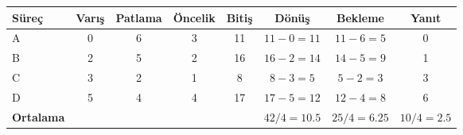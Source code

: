 \begin{tabular}{@{}lccccccc@{}}
\toprule
\textbf{Süreç} & \textbf{Varış} & \textbf{Patlama} & \textbf{Öncelik} & \textbf{Bitiş} & \textbf{Dönüş} & \textbf{Bekleme} & \textbf{Yanıt}\\
\midrule
A & 0 & 6 & 3 & 11 & $11-0=11$ & $11-6=5$ & 0\\
B & 2 & 5 & 2 & 16 & $16-2=14$ & $14-5=9$ & 1\\
C & 3 & 2 & 1 & 8 & $8-3=5$ & $5-2=3$ & 3\\
D & 5 & 4 & 4 & 17 & $17-5=12$ & $12-4=8$ & 6\\
\midrule
\textbf{Ortalama} &  &  &  &  & $42/4=10.5$ & $25/4=6.25$ & $10/4=2.5$\\
\bottomrule
\end{tabular}
